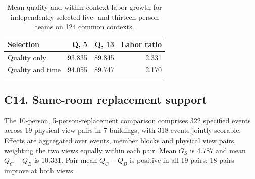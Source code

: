 \documentclass[10pt]{article}
\begin{document}
\begin{table}[t]
\centering\small
\caption{Mean quality and within-context labor growth for independently selected five- and thirteen-person teams on 124 common contexts.}
\label{tab:budget-quality-labor}
\setlength{\tabcolsep}{3pt}\renewcommand{\arraystretch}{1.12}
\begin{tabular*}{\linewidth}{@{\extracolsep{\fill}}lrrr@{}}
\hline
Selection & Q, 5 & Q, 13 & Labor ratio\\\hline
Quality only & 93.835 & 89.845 & 2.331\\
Quality and time & 94.055 & 89.747 & 2.170\\\hline
\end{tabular*}
\end{table}


\subsection*{C14. Same-room replacement support}

The 10-person, 5-person-replacement comparison comprises 322 specified events across 19 physical view pairs in 7 buildings, with 318 events jointly scorable. Effects are aggregated over events, member blocks and physical view pairs, weighting the two views equally within each pair. Mean $G_S$ is 4.787 and mean $Q_C-Q_B$ is 10.331. Pair-mean $Q_C-Q_B$ is positive in all 19 pairs; 18 pairs improve at both views.



\FloatBarrier


\FloatBarrier

\FloatBarrier

\FloatBarrier

\end{document}

